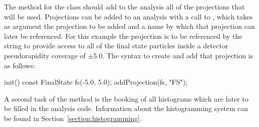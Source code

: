 
The  method for the  class should add to the analysis all
of the projections that will be used.  Projections can be added to an analysis
with a call to , which takes as
argument the projection to be added and a name by which that projection can
later be referenced.  For this example the  projection is to be
referenced by the string  to provide access to all of the final state
particles inside a detector pseudorapidity coverage of $\pm 5.0$.  The syntax to
create and add that projection is as follows:
%
\begin{snippet}
init() {
  const FinalState fs(-5.0, 5.0);
  addProjection(fs, "FS");
}
\end{snippet}
%
A second task of the  method is the booking of all histograms which
are later to be filled in the analysis code. Information about the histogramming
system can be found in Section~\ref{section:histogramming}.


